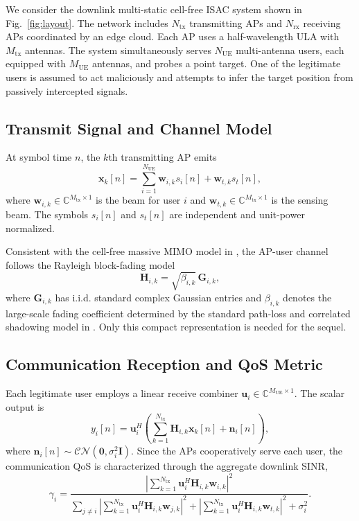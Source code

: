 \documentclass[conference,twocolumn,a4paper]{IEEEtran}
\begin{document}
We consider the downlink multi-static cell-free ISAC system shown in Fig.~\ref{fig:layout}. The network includes $N_{\mathrm{tx}}$ transmitting APs and $N_{\mathrm{rx}}$ receiving APs coordinated by an edge cloud. Each AP uses a half-wavelength ULA with $M_{\mathrm{tx}}$ antennas. The system simultaneously serves $N_{\mathrm{UE}}$ multi-antenna users, each equipped with $M_{\mathrm{UE}}$ antennas, and probes a point target. One of the legitimate users is assumed to act maliciously and attempts to infer the target position from passively intercepted signals.

\subsection{Transmit Signal and Channel Model}
At symbol time $n$, the $k$th transmitting AP emits
\begin{equation}
\mathbf{x}_k[n]=\sum_{i=1}^{N_{\mathrm{UE}}}\mathbf{w}_{i,k}s_i[n]+\mathbf{w}_{t,k}s_t[n],
\label{eq:xk}
\end{equation}
where $\mathbf{w}_{i,k}\in\mathbb{C}^{M_{\mathrm{tx}}\times 1}$ is the beam for user $i$ and $\mathbf{w}_{t,k}\in\mathbb{C}^{M_{\mathrm{tx}}\times 1}$ is the sensing beam. The symbols $s_i[n]$ and $s_t[n]$ are independent and unit-power normalized.

Consistent with the cell-free massive MIMO model in \cite{ngo2017cellfree}, the AP-user channel follows the Rayleigh block-fading model
\begin{equation}
\mathbf{H}_{i,k}=\sqrt{\beta_{i,k}}\,\mathbf{G}_{i,k},
\label{eq:Hik}
\end{equation}
where $\mathbf{G}_{i,k}$ has i.i.d. standard complex Gaussian entries and $\beta_{i,k}$ denotes the large-scale fading coefficient determined by the standard path-loss and correlated shadowing model in \cite{ngo2017cellfree}. Only this compact representation is needed for the sequel.

\subsection{Communication Reception and QoS Metric}
Each legitimate user employs a linear receive combiner $\mathbf{u}_i\in\mathbb{C}^{M_{\mathrm{UE}}\times 1}$. The scalar output is
\begin{equation}
y_i[n]=\mathbf{u}_i^H\left(\sum_{k=1}^{N_{\mathrm{tx}}}\mathbf{H}_{i,k}\mathbf{x}_k[n]+\mathbf{n}_i[n]\right),
\label{eq:yi}
\end{equation}
where $\mathbf{n}_i[n]\sim\mathcal{CN}(\mathbf{0},\sigma_i^2\mathbf{I})$. Since the APs cooperatively serve each user, the communication QoS is characterized through the aggregate downlink SINR,
\begin{equation}
\gamma_i=
\frac{\left|\sum_{k=1}^{N_{\mathrm{tx}}}\mathbf{u}_i^H\mathbf{H}_{i,k}\mathbf{w}_{i,k}\right|^2}{\sum_{j\neq i}\left|\sum_{k=1}^{N_{\mathrm{tx}}}\mathbf{u}_i^H\mathbf{H}_{i,k}\mathbf{w}_{j,k}\right|^2+\left|\sum_{k=1}^{N_{\mathrm{tx}}}\mathbf{u}_i^H\mathbf{H}_{i,k}\mathbf{w}_{t,k}\right|^2+\sigma_i^2}.
\label{eq:sinr-user}
\end{equation}
\end{document}
